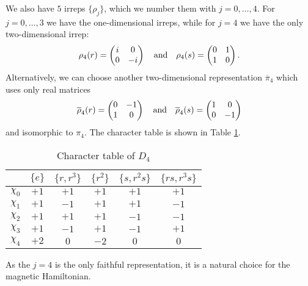 We also have $5$ irreps $\{\rho_j\}$, which we number them with $j=0, \dots, 4$.
For $j=0, \dots,3$ we have the one-dimensional irreps, while for $j=4$ we have the only two-dimensional irrep:
\begin{equation}
    \rho_4(r) =
    \begin{pmatrix}
        i & 0 \\ 0 & -i
    \end{pmatrix}
    \qand
    \rho_4(s) =
    \begin{pmatrix}
        0 & 1 \\ 1 & 0
    \end{pmatrix}.
\end{equation}
Alternatively, we can choose another two-dimensional representation $\overline{\pi}_4$ which uses only real matrices
\begin{equation}
    \overline{\rho}_4(r) =
    \begin{pmatrix}
        0 & -1 \\ 1 & 0
    \end{pmatrix}
    \qand
    \overline{\rho}_4(s) =
    \begin{pmatrix}
        1 & 0 \\ 0 & -1
    \end{pmatrix}
\end{equation}
and isomorphic to $\pi_4$.
The character table is shown in Table \ref{tab:chars_D4}.

\begin{table}[t]
    \centering
    \begin{tabular}{cccccc}
        \toprule
         &  $\{e\}$ & $\{r,r^3\}$ & $\{r^2\}$ & $\{s,r^2s\}$ & $\{rs,r^3s\}$ \\
        \midrule
        $\chi_0$ & $+1$ & $+1$ & $+1$  & $+1$ & $+1$ \\
        $\chi_1$ & $+1$ & $-1$ & $+1$  & $+1$ & $-1$ \\
        $\chi_2$ & $+1$ & $+1$ & $+1$  & $-1$ & $-1$ \\
        $\chi_3$ & $+1$ & $-1$ & $+1$  & $-1$ & $+1$ \\
        $\chi_4$ & $+2$ & $0$  & $-2$  & $0$  & $0$ \\
        \bottomrule
    \end{tabular}
    \caption{Character table of $D_4$}
    \label{tab:chars_D4}
\end{table}

As the $j=4$ is the only faithful representation, it is a natural choice for the magnetic Hamiltonian.
